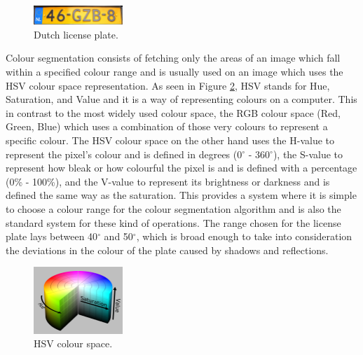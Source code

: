 \begin{figure}[h]
    \centering
    \includegraphics[width=0.3\textwidth]{plaatjes/dutch-plate}
    \caption{Dutch license plate. \cite{dutch-license-fig}}
    \label{fig:dutch-plate}
\end{figure}

Colour segmentation consists of fetching only the areas of an image which fall within a specified colour range and is usually used on an image which uses the HSV colour space representation. As seen in Figure \ref{fig:hsv}, HSV stands for Hue, Saturation, and Value and it is a way of representing colours on a computer. This in contrast to the most widely used colour space, the RGB colour space (Red, Green, Blue) which uses a combination of those very colours to represent a specific colour. The HSV colour space on the other hand uses the H-value to represent the pixel's colour and is defined in degrees (0$^{\circ}$ - 360$^{\circ}$), the S-value to represent how bleak or how colourful the pixel is and is defined with a percentage (0\% - 100\%), and the V-value to represent its brightness or darkness and is defined the same way as the saturation. This provides a system where it is simple to choose a colour range for the colour segmentation algorithm and is also the standard system for these kind of operations. The range chosen for the license plate lays between 40$^{\circ}$ and 50$^{\circ}$, which is broad enough to take into consideration the deviations in the colour of the plate caused by shadows and reflections.

\begin{figure}[h]
    \centering
    \includegraphics[width=0.3\textwidth]{plaatjes/hsv}
    \caption{HSV colour space. \cite{hsv-fig}}
    \label{fig:hsv}
\end{figure}

